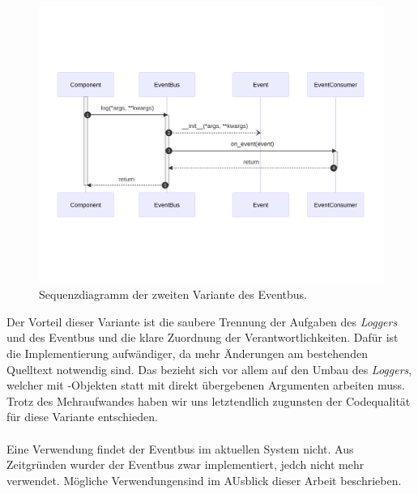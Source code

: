 \begin{figure}[!ht]
	\centering
	\includegraphics[width=1.0\linewidth]{images/diagrams/eventbus-v2-seq.png}
	\caption{Sequenzdiagramm der zweiten Variante des Eventbus.}
	\label{fig:eventbus-v2-seq}
\end{figure}

Der Vorteil dieser Variante ist die saubere Trennung der Aufgaben des \emph{Loggers} und des Eventbus und die klare Zuordnung der Verantwortlichkeiten. Dafür ist die Implementierung aufwändiger, da mehr Änderungen am bestehenden Quelltext notwendig sind. Das bezieht sich vor allem auf den Umbau des \emph{Loggers}, welcher mit -Objekten statt mit direkt übergebenen Argumenten arbeiten muss. Trotz des Mehraufwandes haben wir uns letztendlich zugunsten der Codequalität für diese Variante entschieden.\\
\\
Eine Verwendung findet der Eventbus im aktuellen System nicht. Aus Zeitgründen wurder der Eventbus zwar implementiert, jedch nicht mehr verwendet. Mögliche Verwendungensind im AUsblick dieser Arbeit beschrieben.